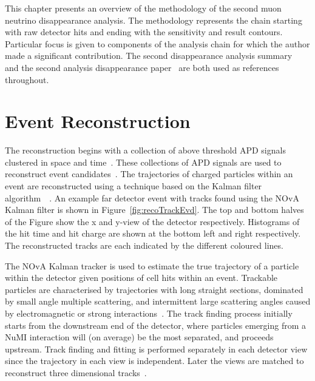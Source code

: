 This chapter presents an overview of the methodology of the second
muon neutrino disappearance analysis. 
The methodology represents the chain starting with raw detector hits
and ending with the sensitivity and result contours. Particular focus
is given to components of the analysis chain for which the author made
a significant contribution.
The second disappearance analysis summary~\cite{SASummary} and the
second analysis disappearance paper~\cite{NOvASA} are both used as
references throughout. 


\section{Event Reconstruction}\label{sec:reco}

The reconstruction begins with a collection of above threshold APD
signals clustered in space and time~\cite{baird2015analysis,
  ester1996density}. 
These collections of APD signals are used to reconstruct event
candidates~\cite{baird2015analysis}.
The trajectories of charged particles within an event are
reconstructed using a technique based on the Kalman filter
algorithm~\cite{kalman1960new}~\cite{KalmanTrackNote}. An example
far detector event with tracks found using the NOvA Kalman filter is
shown in Figure~\ref{fig:recoTrackEvd}.  
The top and bottom halves of the Figure show the x and y-view
of the detector respectively. 
Histograms of the hit time and hit charge are shown at the bottom left
and right respectively.
The reconstructed tracks are each indicated by the different coloured
lines. 

The NOvA Kalman tracker is used to estimate the true trajectory of a
particle within the detector given positions of cell
hits within an event. 
Trackable particles are characterised by trajectories with long 
straight sections, dominated by small angle multiple scattering, and
intermittent large scattering angles caused by electromagnetic or
strong interactions~\cite{KalmanTrackNote}. 
The track finding process initially starts from the downstream end of
the detector, where particles emerging from a NuMI interaction will
(on average) be the most separated, and proceeds upstream. 
Track finding and fitting is performed separately in each detector
view since the trajectory in each view is independent. Later the views
are matched to reconstruct three dimensional tracks~\cite{KalmanTrackNote}. 

